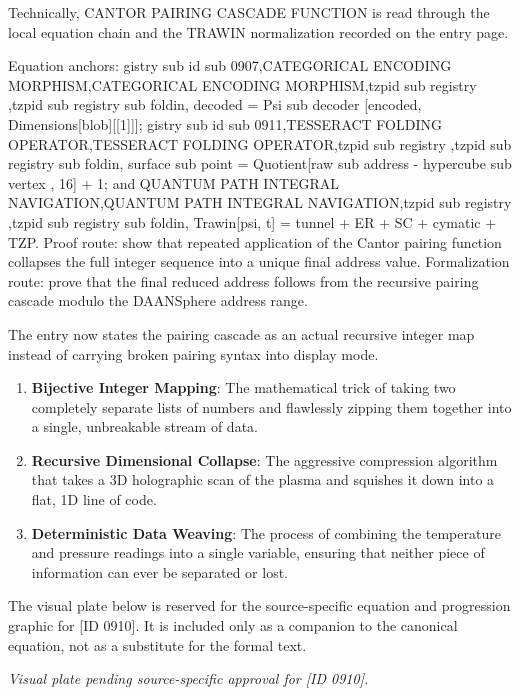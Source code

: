 Technically, CANTOR PAIRING CASCADE FUNCTION is read through the local equation chain and the TRAWIN normalization recorded on the entry page.

Equation anchors: gistry sub id sub 0907,CATEGORICAL ENCODING MORPHISM,CATEGORICAL ENCODING MORPHISM,tzpid sub registry ,tzpid sub registry sub foldin, decoded = Psi sub decoder [encoded, Dimensions[blob][[1]]]; gistry sub id sub 0911,TESSERACT FOLDING OPERATOR,TESSERACT FOLDING OPERATOR,tzpid sub registry ,tzpid sub registry sub foldin, surface sub point = Quotient[raw sub address - hypercube sub vertex , 16] + 1; and QUANTUM PATH INTEGRAL NAVIGATION,QUANTUM PATH INTEGRAL NAVIGATION,tzpid sub registry ,tzpid sub registry sub foldin,  Trawin[psi, t] =  tunnel +  ER +  SC +  cymatic +  TZP. Proof route: show that repeated application of the Cantor pairing function collapses the full integer sequence into a unique final address value. Formalization route: prove that the final reduced address follows from the recursive pairing cascade modulo the DAANSphere address range.

The entry now states the pairing cascade as an actual recursive integer map instead of carrying broken pairing syntax into display mode.
\endgroup

\begin{enumerate}[leftmargin=1.6em,itemsep=6pt,topsep=4pt]
\item \textbf{Bijective Integer Mapping}: The mathematical trick of taking two completely separate lists of numbers and flawlessly zipping them together into a single, unbreakable stream of data.
\item \textbf{Recursive Dimensional Collapse}: The aggressive compression algorithm that takes a 3D holographic scan of the plasma and squishes it down into a flat, 1D line of code.
\item \textbf{Deterministic Data Weaving}: The process of combining the temperature and pressure readings into a single variable, ensuring that neither piece of information can ever be separated or lost.
\end{enumerate}

\begingroup\footnotesize\sloppy
The visual plate below is reserved for the source-specific equation and progression graphic for [ID 0910]. It is included only as a companion to the canonical equation, not as a substitute for the formal text.
\par\endgroup
\begingroup\footnotesize\itshape
Visual plate pending source-specific approval for [ID 0910].
\par\endgroup

